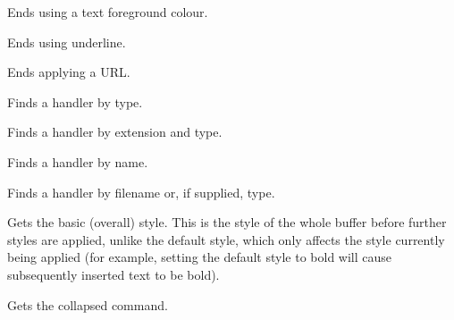 
Ends using a text foreground colour.

\label{wxrichtextbufferendunderline}


Ends using underline.

\label{wxrichtextbufferendurl}


Ends applying a URL.

\label{wxrichtextbufferfindhandler}


Finds a handler by type.


Finds a handler by extension and type.


Finds a handler by name.

\label{wxrichtextbufferfindhandlerfilenameortype}


Finds a handler by filename or, if supplied, type.

\label{wxrichtextbuffergetbasicstyle}


Gets the basic (overall) style. This is the style of the whole
buffer before further styles are applied, unlike the default style, which
only affects the style currently being applied (for example, setting the default
style to bold will cause subsequently inserted text to be bold).

\label{wxrichtextbuffergetbatchedcommand}


Gets the collapsed command.

